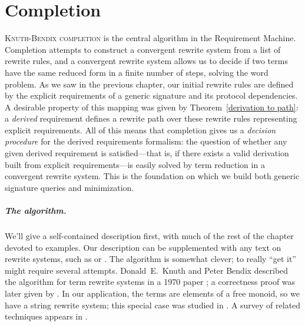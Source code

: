 \documentclass[../generics]{subfiles}
\begin{document}
\chapter{Completion}\label{completion}

%
\lettrine{K}{nuth-Bendix completion} is the central algorithm in the Requirement Machine. Completion attempts to construct a convergent rewrite system from a list of rewrite rules, and a convergent rewrite system allows us to decide if two terms have the same reduced form in a finite number of steps, solving the word problem. As we saw in the previous chapter, our initial rewrite rules are defined by the explicit requirements of a generic signature and its protocol dependencies. A desirable property of this mapping was given by Theorem~\ref{derivation to path}: a \emph{derived} requirement defines a rewrite path over these rewrite rules representing explicit requirements. All of this means that completion gives us a \emph{decision procedure} for the derived requirements formalism: the question of whether any given derived requirement is satisfied---that is, if there exists a valid derivation built from explicit requirements---is easily solved by term reduction in a convergent rewrite system. This is the foundation on which we build both generic signature queries and minimization.

\paragraph{The algorithm.} We'll give a self-contained description first, with much of the rest of the chapter devoted to examples. Our description can be supplemented with any text on rewrite systems, such as \cite{book2012string} or \cite{andallthat}. The algorithm is somewhat clever; to really ``get it'' might require several attempts. Donald~E.~Knuth and Peter Bendix described the algorithm for term rewrite systems in a 1970 paper \cite{Knuth1983}; a correctness proof was later given by \cite{HUET198111}. In our application, the terms are elements of a free monoid, so we have a string rewrite system; this special case was studied in \cite{narendran}. A survey of related techniques appears in \cite{BUCHBERGER19873}.
\end{document}
